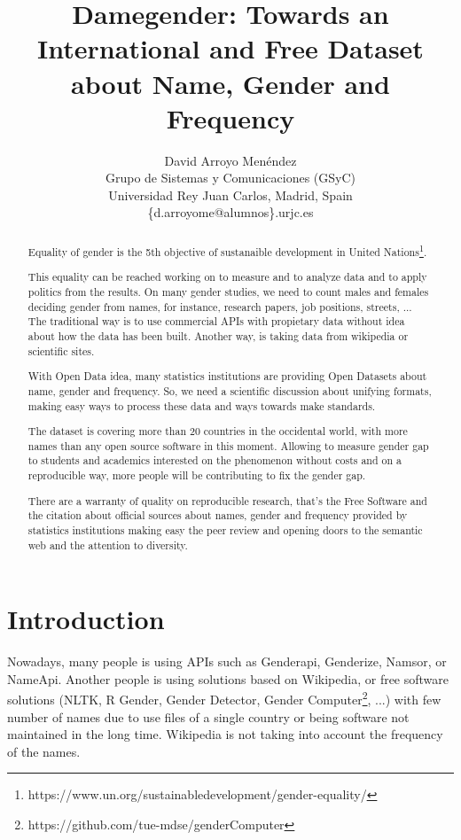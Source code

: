 \documentclass[a4paper]{article}
\title{Damegender: Towards an International and Free Dataset about Name, Gender and Frequency}
\author{
David Arroyo Menéndez \\ Grupo de Sistemas y Comunicaciones (GSyC) \\ Universidad Rey Juan Carlos, Madrid, Spain \\ \{d.arroyome@alumnos\}.urjc.es
}
\begin{document}
\maketitle

\begin{abstract}

  Equality of gender is the 5th objective of sustanaible development
  in United
  Nations\footnote{https://www.un.org/sustainabledevelopment/gender-equality/}.

  This equality can be reached working on to measure and to analyze
  data and to apply politics from the results. On many gender studies,
  we need to count males and females deciding gender from names, for
  instance, research papers, job positions, streets, ... The
  traditional way is to use commercial APIs with propietary data
  without idea about how the data has been built. Another way, is
  taking data from wikipedia or scientific sites.


  With Open Data idea, many statistics institutions are providing Open
  Datasets about name, gender and frequency. So, we need a scientific
  discussion about unifying formats, making easy ways to process these
  data and ways towards make standards.

  
  The dataset is covering more than 20 countries in the occidental
  world, with more names than any open source software in this
  moment. Allowing to measure gender gap to students and academics
  interested on the phenomenon without costs and on a reproducible
  way, more people will be contributing to fix the gender gap.


  There are a warranty of quality on reproducible research, that's the
  Free Software and the citation about official sources about names,
  gender and frequency provided by statistics institutions making easy
  the peer review and opening doors to the semantic web and the
  attention to diversity.
  
\end{abstract}



\section{Introduction}

Nowadays, many people is using APIs such as Genderapi, Genderize,
Namsor, or NameApi. Another people is using solutions based on
Wikipedia, or free software solutions (NLTK\cite{loper2002nltk}, R
Gender, Gender Detector, Gender
Computer\footnote{https://github.com/tue-mdse/genderComputer}, ...)
with few number of names due to use files of a single country or being
software not maintained in the long time. Wikipedia is not taking into
account the frequency of the names.
\end{document}
